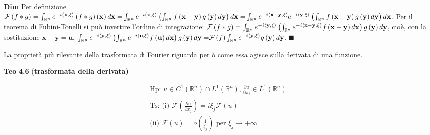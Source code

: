 \documentclass{article}
\begin{document}
\textbf{Dim} Per definizione $\mathcal{F}\left( f\ast g\right) =\int_{%
\mathbb{R}
^{n}}e^{-i\left\langle \mathbf{x,\xi }\right\rangle }\left( f\ast g\right)
\left( \mathbf{x}\right) d\mathbf{x=}\int_{%
\mathbb{R}
^{n}}e^{-i\left\langle \mathbf{x,\xi }\right\rangle }\left( \int_{%
\mathbb{R}
^{n}}f\left( \mathbf{x-y}\right) g\left( \mathbf{y}\right) d\mathbf{y}%
\right) d\mathbf{x=}\int_{%
\mathbb{R}
^{n}}e^{-i\left\langle \mathbf{x-y,\xi }\right\rangle }e^{-i\left\langle 
\mathbf{y,\xi }\right\rangle }\left( \int_{%
\mathbb{R}
^{n}}f\left( \mathbf{x-y}\right) g\left( \mathbf{y}\right) d\mathbf{y}%
\right) d\mathbf{x}$. Per il teorema di Fubini-Tonelli si pu\`{o} invertire
l'ordine di integrazione: $\mathcal{F}\left( f\ast g\right) =\int_{%
\mathbb{R}
^{n}}e^{-i\left\langle \mathbf{y,\xi }\right\rangle }\left( \int_{%
\mathbb{R}
^{n}}e^{-i\left\langle \mathbf{x-y,\xi }\right\rangle }f\left( \mathbf{x-y}%
\right) d\mathbf{x}\right) g\left( \mathbf{y}\right) d\mathbf{y}$, cio\`{e},
con la sostituzione $\mathbf{x-y=u}$, $\int_{%
\mathbb{R}
^{n}}e^{-i\left\langle \mathbf{y,\xi }\right\rangle }\left( \int_{%
\mathbb{R}
^{n}}e^{-i\left\langle \mathbf{u,\xi }\right\rangle }f\left( \mathbf{u}%
\right) d\mathbf{x}\right) g\left( \mathbf{y}\right) d\mathbf{y=}\mathcal{F}%
\left( f\right) \int_{%
\mathbb{R}
^{n}}e^{-i\left\langle \mathbf{y,\xi }\right\rangle }g\left( \mathbf{y}%
\right) d\mathbf{y}$. $\blacksquare $

La propriet\`{a} pi\`{u} rilevante della trasformata di Fourier riguarda per%
\`{o} come essa agisce sulla derivata di una funzione.

\textbf{Teo} \textbf{4.6 }(\textbf{trasformata della derivata)}

\begin{gather*}
\text{Hp: }u\in C^{1}\left( 
\mathbb{R}
^{n}\right) \cap L^{1}\left( 
\mathbb{R}
^{n}\right) ,\frac{\partial u}{\partial x_{j}}\in L^{1}\left( 
\mathbb{R}
^{n}\right) \\
\text{Ts: (i) }\mathcal{F}\left( \frac{\partial u}{\partial x_{j}}\right)
=i\xi _{j}\mathcal{F}\left( u\right) \\
\text{(ii) }\mathcal{F}\left( u\right) =o\left( \frac{1}{\xi _{j}}\right) 
\text{ per }\xi _{j}\rightarrow +\infty
\end{gather*}
\end{document}
